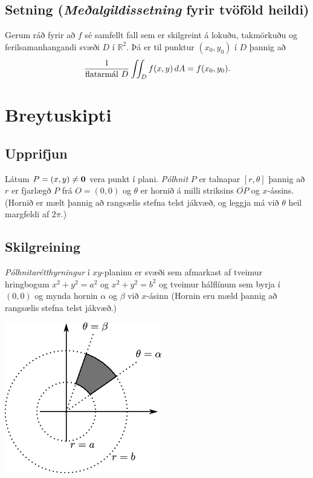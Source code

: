 \documentclass[a4paper,10pt,icelandic]{sphinxmanual}
\begin{document}

\subsection{Setning (\textit{Meðalgildissetning} fyrir tvöföld heildi)}
\label{Kafli4:index-7}\label{Kafli4:setning-fyrir-tvofold-heildi}
Gerum ráð fyrir að \(f\)
sé samfellt fall sem er skilgreint á lokuðu, takmörkuðu og ferilsamanhangandi
svæði \(D\) í \({\mathbb  R}^2\). Þá er til punktur
\((x_0,y_0)\) í \(D\) þannig að
\begin{gather}
\begin{split}\displaystyle \frac{1}{\mbox{flatarmál }D}\int\!\!\!\int_D f(x,y)\,dA=f(x_0,y_0).\end{split}\notag
\end{gather}

\section{Breytuskipti}
\label{Kafli4:index-8}\label{Kafli4:breytuskipti}

\subsection{Upprifjun}
\label{Kafli4:upprifjun}
Látum \(P=(x,y)\neq \mbox{${\bf 0}$}\) vera punkt í plani. \textit{Pólhnit}
\(P\) er talnapar \([r,\theta]\) þannig að \(r\) er fjarlægð
\(P\) frá \(O=(0,0)\) og \(\theta\) er hornið á milli
striksins \(\overline{OP}\) og \(x\)-ássins. (Hornið er mælt
þannig að rangsælis stefna telst jákvæð, og leggja má við \(\theta\)
heil margfeldi af \(2\pi\).)


\subsection{Skilgreining}
\label{Kafli4:id10}\label{Kafli4:index-9}
\emph{Pólhnitarétthyrningur} í \(xy\)-planinu er svæði sem afmarkast af
tveimur hringbogum \(x^2+y^2=a^2\) og \(x^2+y^2=b^2\) og tveimur
hálflínum sem byrja í \((0,0)\) og mynda hornin \(\alpha\) og
\(\beta\) við \(x\)-ásinn (Hornin eru mæld þannig að rangsælis
stefna telst jákvæð.)

{\hfill\includegraphics[width=0.400\linewidth]{polarrett.png}\hfill}
\end{document}
